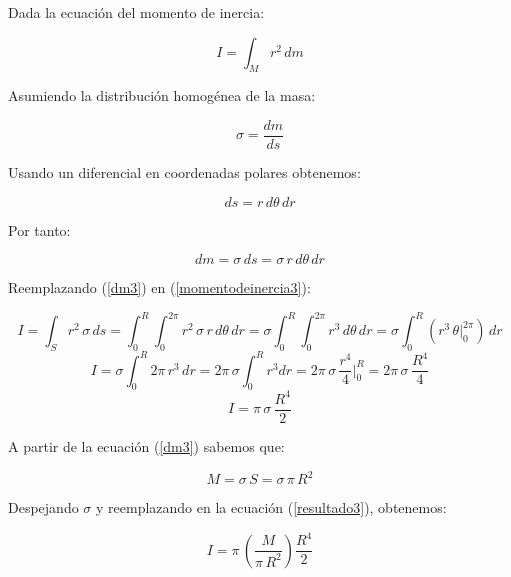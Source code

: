 \documentclass[letter,11pt]{article}
\begin{document}
Dada la ecuación del momento de inercia:

\begin{equation}
    I = \int_{M} r^2\, dm
\label{momentodeinercia3}
\end{equation}

Asumiendo la distribución homogénea de la masa:

\begin{equation*}
    \sigma = \frac{dm}{ds}
\end{equation*}

Usando un diferencial en coordenadas polares obtenemos:

\begin{equation*}
    ds = r\, d\theta\, dr
\end{equation*}

Por tanto:

\begin{equation}
    dm = \sigma\, ds = \sigma\, r\, d\theta\, dr
\label{dm3}
\end{equation}

Reemplazando (\ref{dm3}) en (\ref{momentodeinercia3}):

\begin{equation*}
    I = \int_{S} r^2\, \sigma\, ds = \int_{0}^{R} \int_{0}^{2\pi} r^2\, \sigma\, r\, d\theta\, dr = \sigma \int_{0}^{R} \int_{0}^{2\pi} r^3\, d\theta\, dr = \sigma \int_{0}^{R} ( r^3\, \theta \Biggr|_{0}^{2\pi} )\, dr
\end{equation*}
\begin{equation*}
    I = \sigma \int_{0}^{R} 2\pi\, r^3\, dr = 2\pi\, \sigma \int_{0}^{R} r^3 dr = 2\pi\, \sigma\, \frac{r^4}{4} \Biggr|_{0}^{R} = 2\pi\, \sigma\, \frac{R^4}{4}
\end{equation*}
\begin{equation}
    I = \pi\, \sigma\, \frac{R^4}{2}
\label{resultado3}
\end{equation}

A partir de la ecuación (\ref{dm3}) sabemos que:

\begin{equation*}
    M = \sigma\, S = \sigma\, \pi\, R^2
\end{equation*}

Despejando $\sigma$ y reemplazando en la ecuación (\ref{resultado3}), obtenemos:

\begin{equation*}
    I = \pi\, \left( \frac{M}{\pi\, R^2} \right) \frac{R^4}{2}
\end{equation*}
\end{document}
